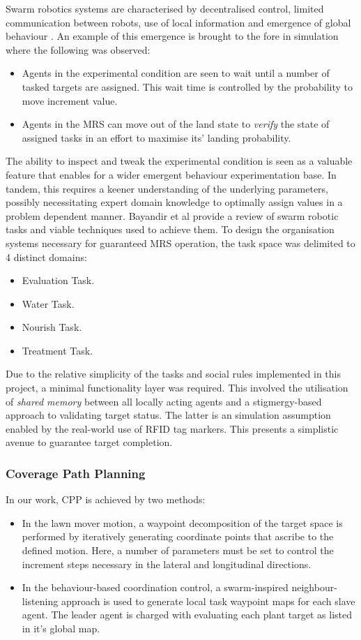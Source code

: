\documentclass{report}
\begin{document}
Swarm robotics systems are characterised by decentralised control, limited communication between robots, use of local information and emergence of global behaviour \cite{Dorigo2013}. An example of this emergence is brought to the fore in simulation where the following was observed:
\begin{itemize}
	\item Agents in the experimental condition are seen to wait until a number of tasked targets are assigned. This wait time is controlled by the probability to move increment value.
	\item Agents in the MRS can move out of the land state to \textit{verify} the state of assigned tasks in an effort to maximise its' landing probability.
\end{itemize}

The ability to inspect and tweak the experimental condition is seen as a valuable feature that enables for a wider emergent behaviour experimentation base. In tandem, this requires a keener understanding of the underlying parameters, possibly necessitating expert domain knowledge to optimally assign values in a problem dependent manner. Bayandir et al \cite{Bayindir2016} provide a review of swarm robotic tasks and viable techniques used to achieve them. To design the organisation systems necessary for guaranteed MRS operation, the task space was delimited to 4 distinct domains:
\begin{itemize}
	\item Evaluation Task.
	\item Water Task.
	\item Nourish Task.
	\item Treatment Task.
\end{itemize}

Due to the relative simplicity of the tasks and social rules implemented in this project, a minimal functionality layer was required. This involved the utilisation of \textit{shared memory} between all locally acting agents and a stigmergy-based approach to validating target status. The latter is an simulation assumption enabled by the real-world use of RFID tag markers. This presents a simplistic avenue to guarantee target completion.

\subsubsection{Coverage Path Planning}
In our work, CPP is achieved by two methods:
\begin{itemize}
	\item In the lawn mover motion, a waypoint decomposition of the target space is performed by iteratively generating coordinate points that ascribe to the defined motion. Here, a number of parameters must be set to control the increment steps necessary in the lateral and longitudinal directions.
	\item In the behaviour-based coordination control, a swarm-inspired neighbour-listening approach is used to generate local task waypoint maps for each slave agent. The leader agent is charged with evaluating each plant target as listed in it’s global map.
\end{itemize}
\end{document}
